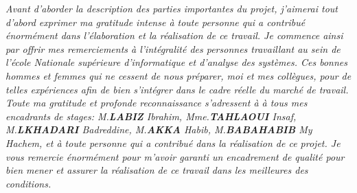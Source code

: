 \textit{
    Avant d'aborder la description des parties importantes du projet,
    j'aimerai tout d’abord exprimer ma gratitude
    intense à toute personne qui a contribué énormément dans l'élaboration
    et la réalisation de ce travail. Je commence
    ainsi par offrir mes remerciements à l'intégralité des personnes
    travaillant au sein de l’école Nationale supérieure d’informatique et d’analyse
    des systèmes. Ces bonnes hommes et femmes qui ne cessent de nous préparer, moi
    et
    mes collègues, pour de telles expériences afin de bien s’intégrer dans
    le cadre réelle du marché de travail.
    Toute ma gratitude et profonde reconnaissance s’adressent à à tous mes
    encadrants de stages: M.\textbf{LABIZ} Ibrahim,  Mme.\textbf{TAHLAOUI} Insaf, M.\textbf{LKHADARI} Badreddine,
    M.\textbf{AKKA} Habib, M.\textbf{BABAHABIB} My Hachem, et à toute personne qui a contribué dans la réalisation de ce projet. Je vous remercie énormément pour m'avoir
    garanti un encadrement de qualité pour bien mener
    et assurer la réalisation de ce travail dans les meilleures des
    conditions.
}